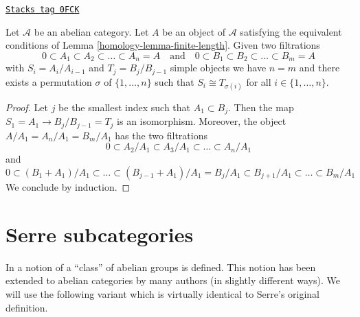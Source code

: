 \begin{lemma}

\label{homology-lemma-jordan-holder}
\href{https://stacks.math.columbia.edu/tag/0FCK}{\texttt{Stacks tag 0FCK}}

Let $\mathcal{A}$ be an abelian category. Let $A$ be an object
of $\mathcal{A}$ satisfying the equivalent conditions of
Lemma \ref{homology-lemma-finite-length}. Given two filtrations
$$
0 \subset A_1 \subset A_2 \subset \ldots \subset A_n = A
\quad\text{and}\quad
0 \subset B_1 \subset B_2 \subset \ldots \subset B_m = A
$$
with $S_i = A_i/A_{i - 1}$ and $T_j = B_j/B_{j - 1}$ simple objects we have
$n = m$ and there exists a permutation $\sigma$ of $\{1, \ldots, n\}$
such that $S_i \cong T_{\sigma(i)}$ for all $i \in \{1, \ldots, n\}$.
\end{lemma}

\begin{proof}
Let $j$ be the smallest index such that $A_1 \subset B_j$.
Then the map $S_1 = A_1 \to B_j/B_{j - 1} = T_j$ is an isomorphism.
Moreover, the object $A/A_1 = A_n/A_1 = B_m/A_1$
has the two filtrations
$$
0 \subset A_2/A_1 \subset A_3/A_1 \subset \ldots \subset A_n/A_1
$$
and
$$
0 \subset (B_1 + A_1)/A_1 \subset \ldots \subset
(B_{j - 1} + A_1)/A_1 = B_j/A_1 \subset B_{j + 1}/A_1
\subset \ldots \subset B_m/A_1
$$
We conclude by induction.
\end{proof}

\section{Serre subcategories}
\label{homology-section-serre-subcategories}
In \cite[Chapter I, Section 1]{Serre_homotopie_classes}
a notion of a ``class'' of abelian groups is defined.
This notion has been extended to abelian categories by many authors
(in slightly different ways). We will use the following variant
which is virtually identical to Serre's original definition.

